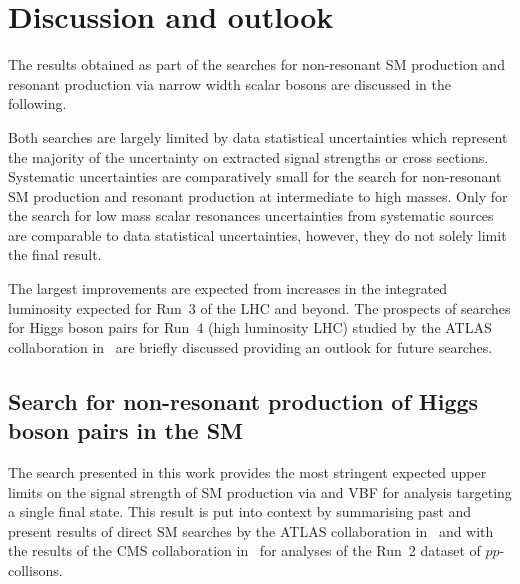 \section{Discussion and outlook}%
\label{sec:result_discussion}


The results obtained as part of the searches for non-resonant SM \HH
production and resonant production via narrow width scalar bosons are
discussed in the following.

Both searches are largely limited by data statistical uncertainties
which represent the majority of the uncertainty on extracted signal
strengths or cross sections. Systematic uncertainties are
comparatively small for the search for non-resonant SM \HH production
and resonant production at intermediate to high masses. Only for the
search for low mass scalar resonances uncertainties from systematic
sources are comparable to data statistical uncertainties, however,
they do not solely limit the final result.

The largest improvements are expected from increases in the integrated
luminosity expected for Run~3 of the LHC and beyond. The prospects of
searches for Higgs boson pairs for Run~4 (high luminosity LHC) studied
by the ATLAS collaboration
in~\cite{ATL-PHYS-PUB-2021-044,ATL-PHYS-PUB-2022-005} are briefly
discussed providing an outlook for future searches.


\subsection{Search for non-resonant production of Higgs boson pairs in
  the SM}

The search presented in this work provides the most stringent expected
upper limits on the signal strength of SM \HH production via \ggF and
VBF for analysis targeting a single final state. This result is put
into context by summarising past and present results of direct SM \HH
searches by the ATLAS collaboration
in~ and with the results of the CMS
collaboration in~ for analyses of the Run~2
dataset of $pp$-collisons.

